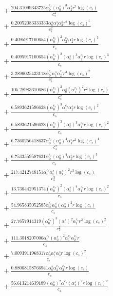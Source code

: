 \documentclass[10pt]{article}
\begin{document}
\begin{align*}
&{}  + \frac{204.31099343725 \alpha_{0}^{c_s} \left(\alpha_{0}^s\right)^{3} \alpha_{2}^s r^{2} \log{\left(c_{s} \right)}}{c_{s}^{2}} \\
&{}  + \frac{0.20052083333333 \alpha_{0}^s \alpha_{1}^s \alpha_{3}^s r^{2} \log{\left(c_{s} \right)}^{5}}{c_{s}^{2}} \\
&{}  + \frac{0.4095917100654 \left(\alpha_{0}^{c_s}\right)^{2} \alpha_{2}^{c_s} \alpha_{2}^s r \log{\left(c_{s} \right)}^{3}}{c_{s}} \\
&{}  + \frac{0.4095917100654 \left(\alpha_{0}^{c_s}\right)^{2} \left(\alpha_{0}^s\right)^{3} \alpha_{2}^{c_s} r \log{\left(c_{s} \right)}^{3}}{c_{s}} \\
&{}  + \frac{3.2896025433118 \alpha_{0}^{c_s} \alpha_{1}^s \alpha_{2}^{c_s} r^{3} \log{\left(c_{s} \right)}^{2}}{c_{s}^{3}} \\
&{}  + \frac{105.28983610686 \left(\alpha_{0}^{c_s}\right)^{2} \alpha_{0}^s \left(\alpha_{1}^{c_s}\right)^{2} r^{2} \log{\left(c_{s} \right)}}{c_{s}^{2}} \\
&{}  + \frac{6.5893621596628 \left(\alpha_{0}^{c_s}\right)^{3} \alpha_{1}^{c_s} \alpha_{2}^s r \log{\left(c_{s} \right)}^{2}}{c_{s}} \\
&{}  + \frac{6.5893621596628 \left(\alpha_{0}^{c_s}\right)^{3} \left(\alpha_{0}^s\right)^{3} \alpha_{1}^{c_s} r \log{\left(c_{s} \right)}^{2}}{c_{s}} \\
&{}  + \frac{6.7360256418637 \alpha_{0}^{c_s} \left(\alpha_{0}^s\right)^{4} \alpha_{1}^s r^{2} \log{\left(c_{s} \right)}^{4}}{c_{s}^{2}} \\
&{}  + \frac{6.7533559587631 \alpha_{0}^{c_s} \left(\alpha_{0}^s\right)^{4} \alpha_{2}^s r \log{\left(c_{s} \right)}^{3}}{c_{s}} \\
&{}  + \frac{217.4212748151 \alpha_{0}^{c_s} \alpha_{0}^s \left(\alpha_{1}^s\right)^{2} r^{3} \log{\left(c_{s} \right)}}{c_{s}^{3}} \\
&{}  + \frac{13.736442951374 \left(\alpha_{0}^{c_s}\right)^{2} \left(\alpha_{0}^s\right)^{4} \alpha_{1}^{c_s} r \log{\left(c_{s} \right)}^{2}}{c_{s}} \\
&{}  + \frac{54.965835052585 \alpha_{0}^{c_s} \alpha_{0}^s \left(\alpha_{2}^s\right)^{2} r \log{\left(c_{s} \right)}}{c_{s}} \\
&{}  + \frac{27.7657914319 \left(\alpha_{0}^{c_s}\right)^{3} \left(\alpha_{0}^s\right)^{2} \alpha_{1}^{c_s} r^{2} \log{\left(c_{s} \right)}^{2}}{c_{s}^{2}} \\
&{}  + \frac{111.3018207006 \alpha_{0}^{c_s} \left(\alpha_{0}^s\right)^{2} \alpha_{1}^{c_s} \alpha_{2}^{c_s} r}{c_{s}} \\
&{}  + \frac{7.0093911968317 \alpha_{0}^s \alpha_{1}^s \alpha_{4}^s r \log{\left(c_{s} \right)}^{2}}{c_{s}} \\
&{}  + \frac{0.88068158766941 \alpha_{0}^s \alpha_{2}^{c_s} \alpha_{3}^{c_s} r \log{\left(c_{s} \right)}}{c_{s}} \\
&{}  + \frac{56.613214639189 \left(\alpha_{0}^s\right)^{2} \alpha_{1}^{c_s} \left(\alpha_{1}^s\right)^{2} r \log{\left(c_{s} \right)}^{2}}{c_{s}}
\end{align*}
\end{document}
